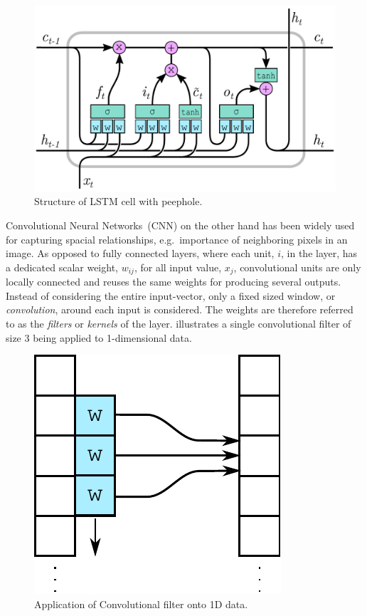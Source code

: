 \documentclass[preprint,11pt,5p,twocolumn]{elsarticle}
\begin{document}
\begin{figure}[!ht]
  \centering
  \includegraphics[scale=.45]{drawings/lstm-peepholes.pdf}
  \caption{Structure of LSTM cell with peephole.}
  \label{fig:lstm-peepholes}
\end{figure}

Convolutional Neural Networks~(CNN) on the other hand has been widely used for capturing spacial relationships, e.g.\ importance of neighboring pixels in an image. As opposed to fully connected layers, where each unit, $i$, in the layer, has a dedicated scalar weight, $w_{ij}$, for all input value, $x_j$, convolutional units are only locally connected and reuses the same weights for producing several outputs. Instead of considering the entire input-vector, only a fixed sized window, or \emph{convolution}, around each input is considered. The weights are therefore referred to as the \emph{filters} or \emph{kernels} of the layer.  illustrates a single convolutional filter of size $3$ being applied to 1-dimensional data.

\begin{figure}[!ht]
  \centering
  \includegraphics[scale=.45]{drawings/conv.pdf}
  \caption{Application of Convolutional filter onto 1D data.}
  \label{fig:conv}
\end{figure}
\end{document}
